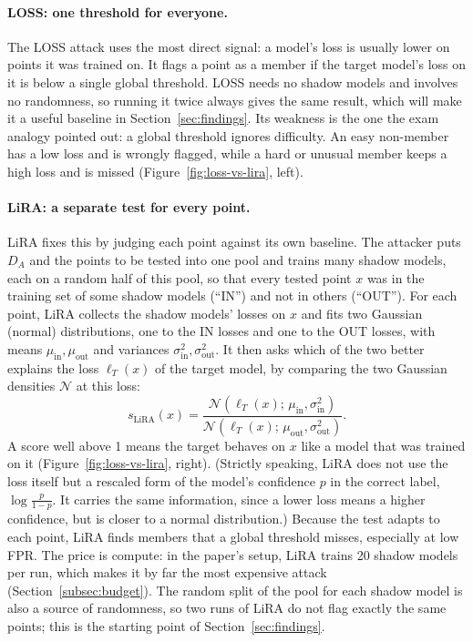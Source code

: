 \documentclass[a4paper]{article}
\begin{document}
\paragraph{LOSS: one threshold for everyone.}
The LOSS attack \citep{yeom2018privacy} uses the most direct signal: a model's loss is usually lower on points it was trained on.
It flags a point as a member if the target model's loss on it is below a single global threshold.
LOSS needs no shadow models and involves no randomness, so running it twice always gives the same result, which will make it a useful baseline in Section~\ref{sec:findings}.
Its weakness is the one the exam analogy pointed out: a global threshold ignores difficulty.
An easy non-member has a low loss and is wrongly flagged, while a hard or unusual member keeps a high loss and is missed (Figure~\ref{fig:loss-vs-lira}, left).

\paragraph{LiRA: a separate test for every point.}
LiRA \citep{carlini2022membership} fixes this by judging each point against its own baseline.
The attacker puts $D_A$ and the points to be tested into one pool and trains many shadow models, each on a random half of this pool, so that every tested point $x$ was in the training set of some shadow models (``IN'') and not in others (``OUT'').
For each point, LiRA collects the shadow models' losses on $x$ and fits two Gaussian (normal) distributions, one to the IN losses and one to the OUT losses, with means $\mu_{\text{in}}, \mu_{\text{out}}$ and variances $\sigma_{\text{in}}^2, \sigma_{\text{out}}^2$.
It then asks which of the two better explains the loss $\ell_T(x)$ of the target model, by comparing the two Gaussian densities $\mathcal{N}$ at this loss:
\[
  s_{\text{LiRA}}(x) = \frac{\mathcal{N}\!\left(\ell_T(x);\, \mu_{\text{in}}, \sigma_{\text{in}}^2\right)}{\mathcal{N}\!\left(\ell_T(x);\, \mu_{\text{out}}, \sigma_{\text{out}}^2\right)}.
\]
A score well above 1 means the target behaves on $x$ like a model that was trained on it (Figure~\ref{fig:loss-vs-lira}, right).
(Strictly speaking, LiRA does not use the loss itself but a rescaled form of the model's confidence $p$ in the correct label, $\log\frac{p}{1-p}$. It carries the same information, since a lower loss means a higher confidence, but is closer to a normal distribution.)
Because the test adapts to each point, LiRA finds members that a global threshold misses, especially at low FPR.
The price is compute: in the paper's setup, LiRA trains 20 shadow models per run, which makes it by far the most expensive attack (Section~\ref{subsec:budget}).
The random split of the pool for each shadow model is also a source of randomness, so two runs of LiRA do not flag exactly the same points; this is the starting point of Section~\ref{sec:findings}.
\end{document}
